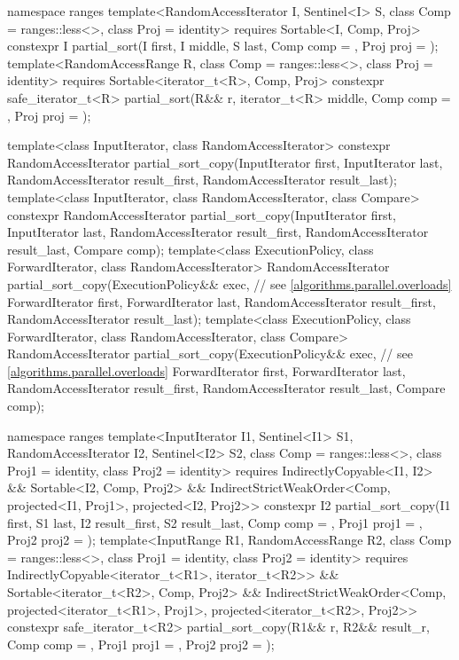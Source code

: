 \begin{codeblock}
{  namespace ranges {
    template<RandomAccessIterator I, Sentinel<I> S, class Comp = ranges::less<>,
        class Proj = identity>
      requires Sortable<I, Comp, Proj>
      constexpr I
        partial_sort(I first, I middle, S last, Comp comp = {}, Proj proj = {});
    template<RandomAccessRange R, class Comp = ranges::less<>, class Proj = identity>
      requires Sortable<iterator_t<R>, Comp, Proj>
      constexpr safe_iterator_t<R>
        partial_sort(R&& r, iterator_t<R> middle, Comp comp = {},
                     Proj proj = {});
  }

  template<class InputIterator, class RandomAccessIterator>
    constexpr RandomAccessIterator
      partial_sort_copy(InputIterator first, InputIterator last,
                        RandomAccessIterator result_first,
                        RandomAccessIterator result_last);
  template<class InputIterator, class RandomAccessIterator, class Compare>
    constexpr RandomAccessIterator
      partial_sort_copy(InputIterator first, InputIterator last,
                        RandomAccessIterator result_first,
                        RandomAccessIterator result_last,
                        Compare comp);
  template<class ExecutionPolicy, class ForwardIterator, class RandomAccessIterator>
    RandomAccessIterator
      partial_sort_copy(ExecutionPolicy&& exec,  // see \ref{algorithms.parallel.overloads}
                        ForwardIterator first, ForwardIterator last,
                        RandomAccessIterator result_first,
                        RandomAccessIterator result_last);
  template<class ExecutionPolicy, class ForwardIterator, class RandomAccessIterator,
           class Compare>
    RandomAccessIterator
      partial_sort_copy(ExecutionPolicy&& exec,  // see \ref{algorithms.parallel.overloads}
                        ForwardIterator first, ForwardIterator last,
                        RandomAccessIterator result_first,
                        RandomAccessIterator result_last,
                        Compare comp);

  namespace ranges {
    template<InputIterator I1, Sentinel<I1> S1, RandomAccessIterator I2, Sentinel<I2> S2,
        class Comp = ranges::less<>, class Proj1 = identity, class Proj2 = identity>
      requires IndirectlyCopyable<I1, I2> && Sortable<I2, Comp, Proj2> &&
          IndirectStrictWeakOrder<Comp, projected<I1, Proj1>, projected<I2, Proj2>>
      constexpr I2
        partial_sort_copy(I1 first, S1 last, I2 result_first, S2 result_last,
                          Comp comp = {}, Proj1 proj1 = {}, Proj2 proj2 = {});
    template<InputRange R1, RandomAccessRange R2, class Comp = ranges::less<>,
        class Proj1 = identity, class Proj2 = identity>
      requires IndirectlyCopyable<iterator_t<R1>, iterator_t<R2>> &&
          Sortable<iterator_t<R2>, Comp, Proj2> &&
          IndirectStrictWeakOrder<Comp, projected<iterator_t<R1>, Proj1>,
            projected<iterator_t<R2>, Proj2>>
      constexpr safe_iterator_t<R2>
        partial_sort_copy(R1&& r, R2&& result_r, Comp comp = {},
                          Proj1 proj1 = {}, Proj2 proj2 = {});
  }

}
\end{codeblock}
